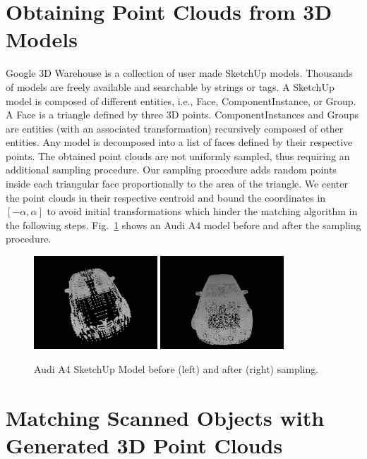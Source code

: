 \documentclass{llncs}
\begin{document}
\section{Obtaining Point Clouds from 3D Models}

Google 3D Warehouse is a collection of user made SketchUp
models. Thousands of models are freely available and searchable by
strings or tags. A SketchUp model is composed of different entities,
i.e., Face, ComponentInstance, or Group. A Face is a triangle defined
by three 3D points. ComponentInstances and Groups are entities (with
an associated transformation) recursively composed of other
entities. Any model is decomposed into a list of faces defined by
their respective points. The obtained point clouds are not uniformly
sampled, thus requiring an additional sampling procedure. Our sampling
procedure adds random points inside each triangular face
proportionally to the area of the triangle. We center the point clouds
in their respective centroid and bound the coordinates in $[-\alpha,
  \alpha]$ to avoid initial transformations which hinder the matching
algorithm in the following steps. Fig.~\ref{audia4resampled} shows
an Audi A4 model before and after the sampling procedure.

  \begin{figure}
    \centering
    \includegraphics[height=35mm]{AudiA4_pointcloud}
    \hspace*{3mm}
    \includegraphics[height=35mm]{AudiA4_resampled}
    \caption{Audi A4 SketchUp Model before (left) and after (right) sampling.}
    \label{audia4resampled}
  \end{figure}

  
\section{Matching Scanned Objects with Generated 3D Point Clouds}
\end{document}
